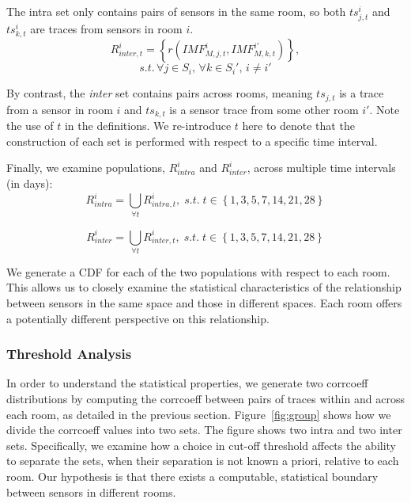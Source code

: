 The intra set only contains pairs of sensors in the same room, so both $ts^{i}_{j,t}$ and $ts^{i}_{k,t}$ are traces from 
sensors in room $i$.
\begin{displaymath}
R^{i}_{inter,t} = \left \{ r(IMF^{i}_{M,j,t}, IMF^{i'}_{M,k,t}) \right \},
\end{displaymath}
\begin{displaymath}
s.t. \, \forall j \in S_i, \, \forall k \in S_i', \, i \neq i' 
\end{displaymath}

By contrast, the \emph{inter} set contains pairs across rooms, meaning $ts_{j,t}$ is a trace from a sensor in room $i$ and 
$ts_{k,t}$ is a sensor trace from some other room $i'$.  %
Note the use of $t$ in the definitions.  We re-introduce $t$ here to denote that the construction of each set is performed with respect to a specific time interval.

Finally, we examine populations, $R^i_{intra}$ and $R^i_{inter}$, across multiple time intervals (in days):%
\begin{displaymath}
R^{i}_{intra} = \bigcup_{\forall t}^{} R^i_{intra, t}, \; s.t. \; t \in \left \{ 1,3,5,7,14,21,28\right \}
\end{displaymath}

\begin{displaymath}
R^{i}_{inter} = \bigcup_{\forall t}^{} R^i_{inter, t}, \; s.t. \; t \in \left \{  1,3,5,7,14,21,28\right \}
\end{displaymath}

We generate a CDF for each of the two populations with respect to each room.  
This allows us to closely examine the statistical characteristics 
of the relationship between sensors in the same space and those in different spaces.  Each room offers a potentially different 
perspective on this relationship.


\subsubsection{Threshold Analysis}
In order to understand the statistical properties, we generate two corrcoeff distributions by computing the corrcoeff between pairs of traces within and across each room, as detailed in the previous section.
Figure~\ref{fig:group} shows how we divide the corrcoeff values into two sets.
The figure shows two intra and two inter sets. Specifically, we examine how a choice in cut-off threshold affects the ability
to separate the sets, when their separation is not known a priori, relative to each room.
Our hypothesis is that there exists a computable, statistical boundary between sensors in different rooms.

